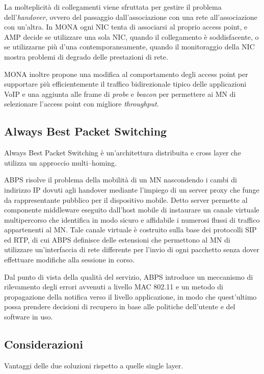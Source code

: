 \documentclass[12pt,a4paper,openright,twoside]{book}
\begin{document}
La molteplicità di collegamenti viene sfruttata per gestire il
problema dell'\emph{handover}, ovvero del passaggio dall'associazione
con una rete all'associazione con un'altra. In MONA ogni NIC tenta di
associarsi al proprio access point, e AMP decide se utilizzare una
sola NIC, quando il collegamento è soddisfacente, o se utilizzarne più
d'una contemporaneamente, quando il monitoraggio della NIC mostra
problemi di degrado delle prestazioni di rete.

MONA inoltre propone una modifica al comportamento degli access point
per supportare più efficientemente il traffico bidirezionale tipico
delle applicazioni VoIP e una aggiunta alle frame di \emph{probe} e
\emph{beacon} per permettere ai MN di selezionare l'access point con
migliore \emph{throughput}.


\subsection{Always Best Packet Switching}

Always Best Packet Switching è un'architettura distribuita e cross
layer che utilizza un approccio multi--homing.

ABPS risolve il problema della mobilità di un MN nascondendo i cambi
di indirizzo IP dovuti agli handover mediante l'impiego di un server
proxy che funge da rappresentante pubblico per il dispositivo
mobile. Detto server permette al componente middleware eseguito
dall'host mobile di instaurare un canale virtuale multipercorso che
identifica in modo sicuro e affidabile i numerosi flussi di traffico
appartenenti al MN. Tale canale virtuale è costruito sulla base dei
protocolli SIP ed RTP, di cui ABPS definisce delle estensioni che
permettono al MN di utilizzare un'interfaccia di rete differente per
l'invio di ogni pacchetto senza dover effettuare modifiche alla
sessione in corso.

Dal punto di vista della qualità del servizio, ABPS introduce un
meccanismo di rilevamento degli errori avvenuti a livello MAC 802.11 e
un metodo di propagazione della notifica verso il livello
applicazione, in modo che quest'ultimo possa prendere decisioni di
recupero in base alle politiche dell'utente e del software in uso.

\subsection{Considerazioni}
Vantaggi delle due soluzioni rispetto a quelle single layer.
\end{document}
